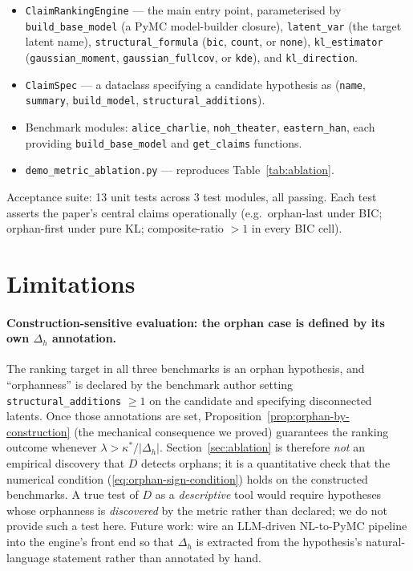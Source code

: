 \documentclass{article}
\begin{document}
\begin{itemize}[leftmargin=*, itemsep=0pt]
\item \texttt{ClaimRankingEngine} --- the main entry point, parameterised
by \texttt{build\_base\_model} (a PyMC model-builder closure),
\texttt{latent\_var} (the target latent name),
\texttt{structural\_formula} (\texttt{bic}, \texttt{count}, or
\texttt{none}), \texttt{kl\_estimator} (\texttt{gaussian\_moment},
\texttt{gaussian\_fullcov}, or \texttt{kde}), and
\texttt{kl\_direction}.
\item \texttt{ClaimSpec} --- a dataclass specifying a candidate
hypothesis as (\texttt{name}, \texttt{summary},
\texttt{build\_model}, \texttt{structural\_additions}).
\item Benchmark modules: \texttt{alice\_charlie},
\texttt{noh\_theater}, \texttt{eastern\_han}, each providing
\texttt{build\_base\_model} and \texttt{get\_claims} functions.
\item \texttt{demo\_metric\_ablation.py} --- reproduces
Table~\ref{tab:ablation}.
\end{itemize}

Acceptance suite: 13 unit tests across 3 test modules, all passing.
Each test asserts the paper's central claims operationally
(e.g.\ orphan-last under BIC; orphan-first under pure KL;
composite-ratio $> 1$ in every BIC cell).

\section{Limitations}
\label{sec:limitations}

\paragraph{Construction-sensitive evaluation: the orphan case is
defined by its own $\Delta_{h}$ annotation.} The ranking target in all
three benchmarks is an orphan hypothesis, and ``orphanness'' is
declared by the benchmark author setting \texttt{structural\_additions}
$\geq 1$ on the candidate and specifying disconnected latents. Once
those annotations are set, Proposition~\ref{prop:orphan-by-construction}
(the mechanical consequence we proved) guarantees the ranking outcome
whenever $\lambda > \kappa^{*}/|\Delta_{h}|$. Section~\ref{sec:ablation}
is therefore \emph{not} an empirical discovery that $D$ detects
orphans; it is a quantitative check that the numerical condition
(\ref{eq:orphan-sign-condition}) holds on the constructed
benchmarks. A true test of $D$ as a \emph{descriptive} tool would
require hypotheses whose orphanness is \emph{discovered} by the
metric rather than declared; we do not provide such a test here.
Future work: wire an LLM-driven NL-to-PyMC pipeline
\citep{wong2023wordmodels} into the engine's front end so that
$\Delta_{h}$ is extracted from the hypothesis's natural-language
statement rather than annotated by hand.
\end{document}
